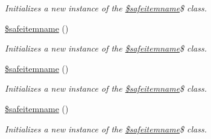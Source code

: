 \begin{DoxyCompactItemize}
\begin{DoxyCompactList}\small\item\em Initializes a new instance of the \hyperlink{class_0Brootnamespace_1_1_0Bsafeitemname}{\$safeitemname}\$ class. \end{DoxyCompactList}\item 
\hyperlink{class_0Brootnamespace_1_1_0Bsafeitemname_abbf88d241ae254db33a6740dee265a73}{\$safeitemname} ()
\begin{DoxyCompactList}\small\item\em Initializes a new instance of the \hyperlink{class_0Brootnamespace_1_1_0Bsafeitemname}{\$safeitemname}\$ class. \end{DoxyCompactList}\item 
\hyperlink{class_0Brootnamespace_1_1_0Bsafeitemname_abbf88d241ae254db33a6740dee265a73}{\$safeitemname} ()
\begin{DoxyCompactList}\small\item\em Initializes a new instance of the \hyperlink{class_0Brootnamespace_1_1_0Bsafeitemname}{\$safeitemname}\$ class. \end{DoxyCompactList}\item 
\hyperlink{class_0Brootnamespace_1_1_0Bsafeitemname_abbf88d241ae254db33a6740dee265a73}{\$safeitemname} ()
\begin{DoxyCompactList}\small\item\em Initializes a new instance of the \hyperlink{class_0Brootnamespace_1_1_0Bsafeitemname}{\$safeitemname}\$ class. \end{DoxyCompactList}\end{DoxyCompactItemize}
